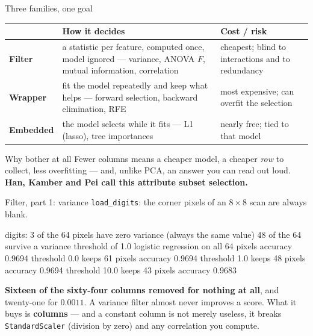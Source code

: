 \documentclass[aspectratio=169]{beamer}
\begin{document}
\begin{frame}[shrink=6]{Three families, one goal}
  \begin{center}\small
  \begin{tabular}{@{}lp{4.3cm}p{3.9cm}@{}}
    \toprule
    & \textbf{How it decides} & \textbf{Cost / risk}\\
    \midrule
    \textbf{Filter} & a statistic per feature, computed once, model ignored
      --- variance, ANOVA $F$, mutual information, correlation &
      cheapest; blind to interactions and to redundancy\\[5pt]
    \textbf{Wrapper} & fit the model repeatedly and keep what helps ---
      forward selection, backward elimination, RFE &
      most expensive; can overfit the selection\\[5pt]
    \textbf{Embedded} & the model selects while it fits --- L1 (lasso), tree
      importances & nearly free; tied to that model\\
    \bottomrule
  \end{tabular}
  \end{center}
  \vspace{0.3em}
  \begin{block}{Why bother at all}
    \small Fewer columns means a cheaper model, a cheaper \emph{row} to
    collect, less overfitting --- and, unlike PCA, an answer you can read
    out loud. \textbf{Han, Kamber and Pei call this attribute subset
    selection.}
  \end{block}
\end{frame}

\begin{frame}[fragile,shrink=6]{Filter, part 1: variance}
\texttt{load\_digits}: the corner pixels of an $8\times8$ scan are always
blank.
\begin{outblk}
digits: 3 of the 64 pixels have zero variance (always the same value)
        48 of the 64 survive a variance threshold of 1.0
logistic regression on all 64 pixels          accuracy 0.9694
      threshold   0.0 keeps 61 pixels            accuracy 0.9694
      threshold   1.0 keeps 48 pixels            accuracy 0.9694
      threshold  10.0 keeps 43 pixels            accuracy 0.9683
\end{outblk}
\begin{center}\small
  \textbf{Sixteen of the sixty-four columns removed for nothing at all}, and
  twenty-one for $0.0011$. A variance filter almost never improves a score.
  What it buys is \textbf{columns} --- and a constant column is not merely useless, it breaks
  \texttt{StandardScaler} (division by zero) and any correlation you compute.
\end{center}
\end{frame}
\end{document}
